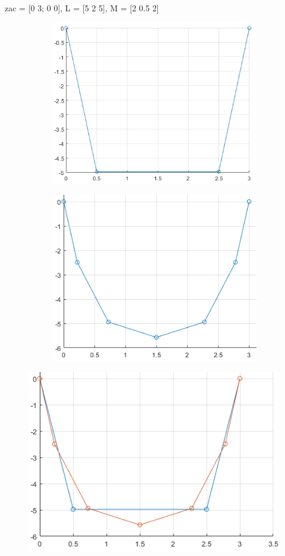 \documentclass[A4paper, 11pt]{article}
\begin{document}
zac = [0 3; 0 0], \quad L = [5 2 5], \quad M = [2 0.5 2]
\begin{figure}[h]
\begin{subfigure}{.5\textwidth}
\includegraphics[scale=0.5]{simetricna_liha_2}
\end{subfigure}
\begin{subfigure}{.5\textwidth}
\includegraphics[scale=0.5]{prepolovljena_2}
\end{subfigure}
\end{figure}
\begin{figure}[h]
\centering
\includegraphics[scale=0.8]{liha_in_soda_2}
\end{figure}
\end{document}
